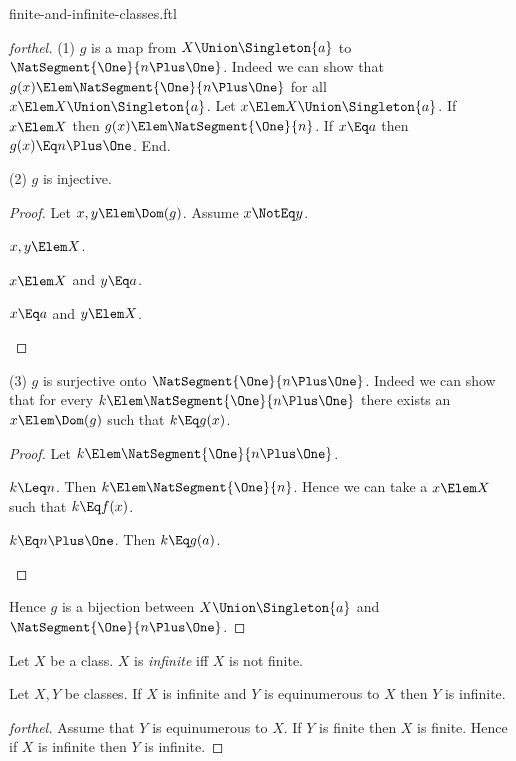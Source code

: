 \documentclass{stex}
\begin{document}
\begin{smodule}{finite-and-infinite-classes.ftl}
\begin{proof}[forthel]
  (1) $g$ is a map from $X \Union \Singleton{a}$ to $\NatSegment{\One}{n \Plus \One}$.
  Indeed we can show that $g(x) \Elem \NatSegment{\One}{n \Plus \One}$ for all $x \Elem X \Union \Singleton{a}$.
    Let $x \Elem X \Union \Singleton{a}$.
    If $x \Elem X$ then $g(x) \Elem \NatSegment{\One}{n}$.
    If $x \Eq a$ then $g(x) \Eq n \Plus \One$.
  End.

  (2) $g$ is injective.
  \begin{proof}
    Let $x, y \Elem \Dom(g)$.
    Assume $x \NotEq y$.
    
    \begin{case}{$x, y \Elem X$.} \end{case}

    \begin{case}{$x \Elem X$ and $y \Eq a$.} \end{case}

    \begin{case}{$x \Eq a$ and $y \Elem X$.} \end{case}
  \end{proof}

  (3) $g$ is surjective onto $\NatSegment{\One}{n \Plus \One}$.
  Indeed we can show that for every $k \Elem \NatSegment{\One}{n \Plus \One}$ there exists an $x \Elem \Dom(g)$ such that $k \Eq g(x)$.
  \begin{proof}
    Let $k \Elem \NatSegment{\One}{n \Plus \One}$.

    \begin{case}{$k \Leq n$.}
      Then $k \Elem \NatSegment{\One}{n}$.
      Hence we can take a $x \Elem X$ such that $k \Eq f(x)$.
    \end{case}

    \begin{case}{$k \Eq n \Plus \One$.}
      Then $k \Eq g(a)$.
    \end{case}
  \end{proof}

  Hence $g$ is a bijection between $X \Union \Singleton{a}$ and $\NatSegment{\One}{n \Plus \One}$.
\end{proof}

\begin{definition*}[forthel,for=infinite]
  Let $X$ be a class.
  $X$ is \emph{infinite} iff $X$ is not finite.
\end{definition*}

\begin{proposition*}[forthel]
  Let $X, Y$ be classes.
  If $X$ is infinite and $Y$ is equinumerous to $X$ then $Y$ is infinite.
\end{proposition*}
\begin{proof}[forthel]
  Assume that $Y$ is equinumerous to $X$.
  If $Y$ is finite then $X$ is finite.
  Hence if $X$ is infinite then $Y$ is infinite.
\end{proof}

\end{smodule}
\end{document}
